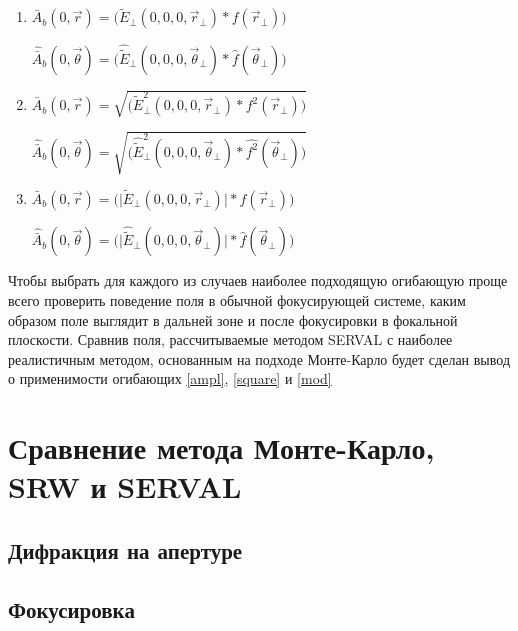 \begin{enumerate}[label=\Roman*.]
	\item \label{ampl} $\bar{A}_{b} (0, \vec{r}) = \big(\widetilde{E}_{\bot}(0, 0, 0, \vec{r}_{\bot}) \ast f(\vec{r}_{\bot})\big)$
	
	$\hat{\bar{A}}_{b} (0, \vec{\theta}) = \big(\hat{\widetilde{E}}_{\bot}(0, 0, 0, \vec{\theta}_{\bot}) \ast \hat{f}(\vec{\theta}_{\bot})\big)$\\

	\item \label{square} $\bar{A}_{b} (0, \vec{r}) = \sqrt{\big(\widetilde{E}^2_{\bot}(0, 0, 0, \vec{r}_{\bot}) \ast f^2(\vec{r}_{\bot})\big)}$
	
	$\hat{\bar{A}}_{b} (0, \vec{\theta}) = \sqrt{\big(\hat{\widetilde{E}}^2_{\bot}(0, 0, 0, \vec{\theta}_{\bot}) \ast \hat{f^2}(\vec{\theta}_{\bot})\big)}$\\
	
	\item \label{mod} $\bar{A}_{b} (0, \vec{r}) = \big(\big|\widetilde{E}_{\bot}(0, 0, 0, \vec{r}_{\bot})\big| \ast f(\vec{r}_{\bot})\big)$
	
	$\hat{\bar{A}}_{b} (0, \vec{\theta}) = \big(\big|\hat{\widetilde{E}}_{\bot}(0, 0, 0, \vec{\theta}_{\bot})\big| \ast \hat{f}(\vec{\theta}_{\bot})\big)$\\
\end{enumerate}
Чтобы выбрать для каждого из случаев наиболее подходящую огибающую проще всего проверить поведение поля в обычной фокусирующей системе, каким образом поле выглядит в дальней зоне и после фокусировки в фокальной плоскости. Сравнив поля, рассчитываемые методом SERVAL с наиболее реалистичным методом, основанным на подходе Монте-Карло будет сделан вывод о применимости огибающих \ref{ampl}, \ref{square} и \ref{mod} 


\section{Сравнение метода Монте-Карло, SRW и SERVAL}

\subsection{Дифракция на апертуре}

\subsection{Фокусировка}











